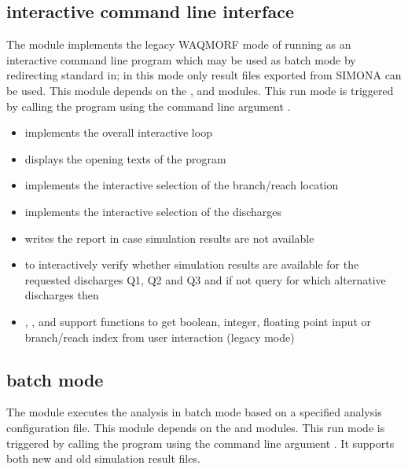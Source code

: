 \subsection{interactive command line interface }

The  module implements the legacy WAQMORF mode of running as an interactive command line program which may be used as batch mode by redirecting standard in; in this mode only result files exported from SIMONA can be used.
This module depends on the ,  and  modules.
This run mode is triggered by calling the program using the command line argument .

\begin{itemize}
\item {} implements the overall interactive loop
\item {} displays the opening texts of the program
\item {} implements the interactive selection of the branch/reach location
\item {} implements the interactive selection of the discharges

\item {} writes the report in case simulation results are not available
\item {} to interactively verify whether simulation results are available for the requested discharges Q1, Q2 and Q3 and if not query for which alternative discharges then
\item {}, ,  and  support functions to get boolean, integer, floating point input or branch/reach index from user interaction (legacy mode)
\end{itemize}


\subsection{batch mode }

The  module executes the analysis in batch mode based on a specified analysis configuration file.
This module depends on the  and  modules.
This run mode is triggered by calling the program using the command line argument .
It supports both new and old simulation result files.

